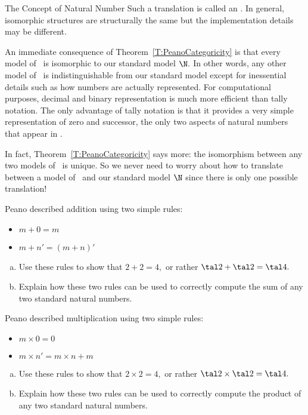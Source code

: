 \begin{unit}{The Concept of Natural Number}
\noindent
Such a translation is called an .
In general, isomorphic structures are structurally the same but the implementation details may be different.

An immediate consequence of Theorem~\ref{T:PeanoCategoricity} is that every model of \PA\ is isomorphic to our standard model \(\N.\) 
In other words, any other model of \PA\ is indistinguishable from our standard model except for inessential details such as how numbers are actually represented.
For computational purposes, decimal and binary representation is much more efficient than tally notation.
The only advantage of tally notation is that it provides a very simple representation of zero and successor, the only two aspects of natural numbers that appear in \PA.

In fact, Theorem~\ref{T:PeanoCategoricity} says more: the isomorphism between any two models of \PA\ is unique.
So we never need to worry about how to translate between a model of \PA\ and our standard model \(\N\) since there is only one possible translation!


\begin{problem}
  Peano described addition using two simple rules:
  \begin{itemize}
  \item \(m + 0 = m\)
  \item \(m + n' = (m + n)'\)
  \end{itemize}
  \begin{enumerate}[(a)]
  \item Use these rules to show that \(2 + 2 = 4,\) or rather \(\tal2 + \tal2 = \tal4.\)
  \item Explain how these two rules can be used to correctly compute the sum of any two standard natural numbers.
  \end{enumerate}
\end{problem}

\begin{problem}
  Peano described multiplication using two simple rules:
  \begin{itemize}
  \item \(m \times 0 = 0\)
  \item \(m \times n' = m \times n + m\)
  \end{itemize}
  \begin{enumerate}[(a)]
  \item Use these rules to show that \(2 \times 2 = 4,\) or rather \(\tal2 \times \tal2 = \tal4.\)
  \item Explain how these two rules can be used to correctly compute the product of any two standard natural numbers.
  \end{enumerate}
\end{problem}


\end{unit}
